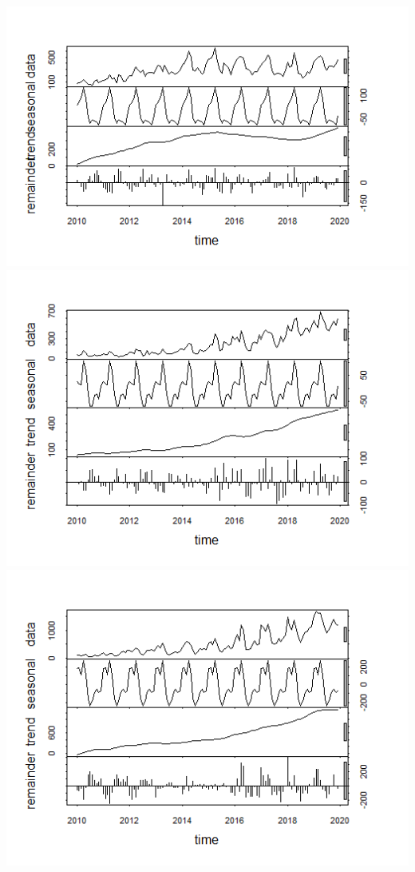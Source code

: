 \documentclass[
  12pt,
]{article}
\begin{document}
\includegraphics{./Output/Durham_event_ts_decomp.png}
\includegraphics{./Output/Orange_event_ts_decomp.png}
\includegraphics{./Output/Wake_event_ts_decomp.png}
\end{document}

